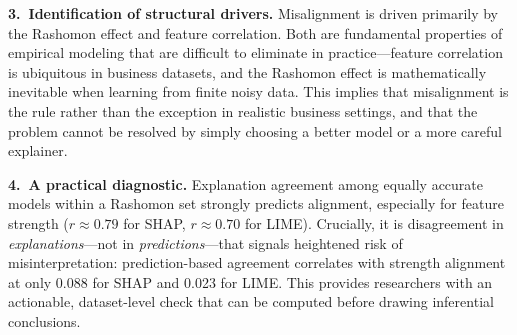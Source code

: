 \documentclass[11pt]{article}
\begin{document}
\noindent\textbf{3.\ Identification of structural drivers.} Misalignment is driven primarily by the Rashomon effect and feature correlation. Both are fundamental properties of empirical modeling \citep{paes23inevitable} that are difficult to eliminate in practice---feature correlation is ubiquitous in business datasets, and the Rashomon effect is mathematically inevitable when learning from finite noisy data. This implies that misalignment is the rule rather than the exception in realistic business settings, and that the problem cannot be resolved by simply choosing a better model or a more careful explainer.

\noindent\textbf{4.\ A practical diagnostic.} Explanation agreement among equally accurate models within a Rashomon set strongly predicts alignment, especially for feature strength ($r \approx 0.79$ for SHAP, $r \approx 0.70$ for LIME). Crucially, it is disagreement in \emph{explanations}---not in \emph{predictions}---that signals heightened risk of misinterpretation: prediction-based agreement correlates with strength alignment at only 0.088 for SHAP and 0.023 for LIME. This provides researchers with an actionable, dataset-level check that can be computed before drawing inferential conclusions.
\end{document}
